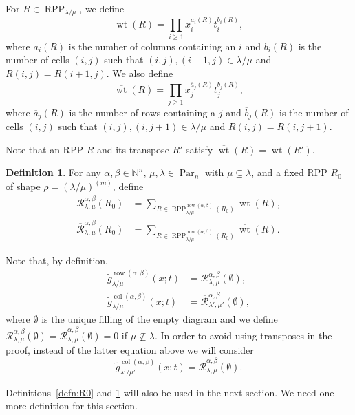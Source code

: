 \documentclass[12pt]{amsart}
\numberwithin{equation}{section}
\theoremstyle{definition}
\newtheorem{defn}[thm]{Definition}
\newcommand\wg{\widetilde{g}}
\newcommand\col{\operatorname{col}}
\newcommand\row{\operatorname{row}}
\newcommand\NN{\mathbb{N}}
\newcommand\Par{\operatorname{Par}}
\newcommand\RPP{\operatorname{RPP}}
\newcommand\lm{{\lambda/\mu}}
\newcommand\wt{\operatorname{wt}}
\newcommand\R{\mathcal{R}}
\newcommand\oR{\overline{\R}}
\newcommand\owt{\overline{\wt}}
\begin{document}
For $R\in\RPP_{\lm}$, we define 
\[
\wt(R)=\prod_{i\ge1}x_i^{a_i(R)} t_i^{b_i(R)},
\]
where $a_i(R)$ is the number of columns containing an $i$ and $b_i(R)$ is the
number of cells $(i,j)$ such that $(i,j),(i+1,j)\in\lm$ and $R(i,j)=R(i+1,j)$.
We also define
\[
\owt(R)=\prod_{j\ge1}x_j^{\overline{a}_j(R)} t_j^{\overline{b}_j(R)},
\]
where $\overline{a}_j(R)$ is the number of rows containing a $j$ and
$\overline{b}_j(R)$ is the number of cells $(i,j)$ such that
$(i,j),(i,j+1)\in\lm$ and $R(i,j)=R(i,j+1)$.



Note that an RPP $R$ and its transpose $R'$ satisfy
$\owt(R)=\wt(R')$.


\begin{defn}\label{defn:R}
  For any $\alpha,\beta\in\NN^n$, $\mu,\lambda\in\Par_n$ with
  $\mu\subseteq\lambda$, and a fixed RPP $R_0$ of shape $\rho=(\lm)^{(m)}$,
  define
\begin{align*}
  \R^{\alpha,\beta}_{\lambda,\mu}(R_0) 
    &=\sum_{R\in \RPP^{\row(\alpha,\beta)}_{\lm}(R_0)} \wt(R),\\
  \oR^{\alpha,\beta}_{\lambda,\mu}(R_0) 
    &=\sum_{R\in \RPP^{\row(\alpha,\beta)}_{\lm}(R_0)} \owt(R).
\end{align*}
\end{defn}

Note that, by definition, 
\begin{align*}
  \wg_{\lambda/\mu}^{\row(\alpha,\beta)}(x;t) &= \R^{\alpha,\beta}_{\lambda,\mu}(\emptyset),\\
  \wg_{\lambda/\mu}^{\col(\alpha,\beta)}(x;t) &=\oR^{\alpha,\beta}_{\lambda',\mu'}(\emptyset),
\end{align*}
where $\emptyset$ is the unique filling of the empty diagram and we define
$\R^{\alpha,\beta}_{\lambda,\mu}(\emptyset)=\oR^{\alpha,\beta}_{\lambda,\mu}(\emptyset)=0$
if $\mu\not\subseteq\lambda$. In order to avoid using transposes in the proof,
instead of the latter equation above we will consider
\[
  \wg_{\lambda'/\mu'}^{\col(\alpha,\beta)}(x;t)
  =\oR^{\alpha,\beta}_{\lambda,\mu}(\emptyset).
\]

Definitions~\ref{defn:R0} and \ref{defn:R} will also be used in the next section.
We need one more definition for this section.
\end{document}
